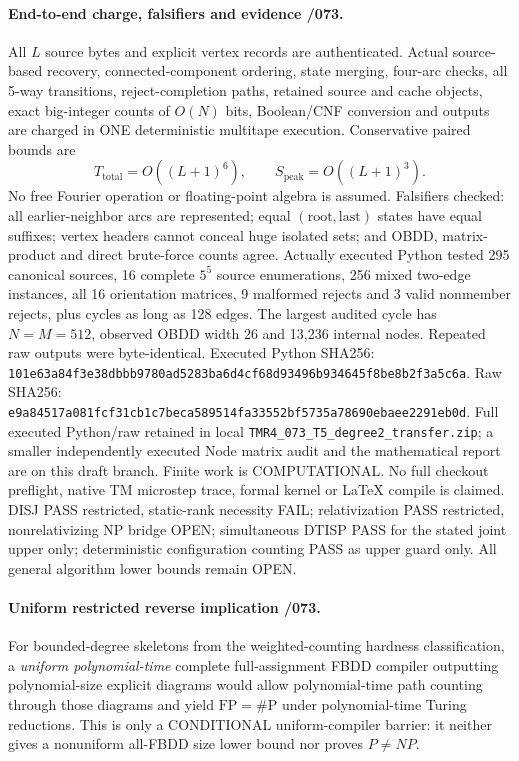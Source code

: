 \documentclass[11pt]{article}
\begin{document}
\paragraph{End-to-end charge, falsifiers and evidence /073.}
All $L$ source bytes and explicit vertex records are authenticated.
Actual source-based recovery, connected-component ordering, state
merging, four-arc checks, all 5-way transitions, reject-completion
paths, retained source and cache objects, exact big-integer
counts of $O(N)$ bits, Boolean/CNF conversion and outputs are
charged in ONE deterministic multitape execution. Conservative
paired bounds are
\[
 T_{\mathrm{total}}=O((L+1)^6),\qquad
 S_{\mathrm{peak}}=O((L+1)^3).
\]
No free Fourier operation or floating-point algebra is assumed.
Falsifiers checked: all earlier-neighbor arcs are represented;
equal $(\mathrm{root},\mathrm{last})$ states have equal suffixes;
vertex headers cannot conceal huge isolated sets; and OBDD,
matrix-product and direct brute-force counts agree.
Actually executed Python tested 295 canonical sources,
16 complete $5^5$ source enumerations, 256 mixed two-edge
instances, all 16 orientation matrices, 9 malformed rejects
and 3 valid nonmember rejects, plus cycles as long as 128 edges.
The largest audited cycle has $N=M=512$, observed OBDD width 26
and 13,236 internal nodes. Repeated raw outputs were byte-identical.
Executed Python SHA256:
\texttt{101e63a84f3e38dbbb9780ad5283ba6d4cf68d93496b934645f8be8b2f3a5c6a}.
Raw SHA256:
\texttt{e9a84517a081fcf31cb1c7beca589514fa33552bf5735a78690ebaee2291eb0d}.
Full executed Python/raw retained in local
\texttt{TMR4\_073\_T5\_degree2\_transfer.zip};
a smaller independently executed Node matrix audit and the
mathematical report are on this draft branch.
Finite work is COMPUTATIONAL. No full checkout preflight,
native TM microstep trace, formal kernel or LaTeX compile is claimed.
DISJ PASS restricted, static-rank necessity FAIL;
relativization PASS restricted, nonrelativizing NP bridge OPEN;
simultaneous DTISP PASS for the stated joint upper only;
deterministic configuration counting PASS as upper guard only.
All general algorithm lower bounds remain OPEN.

\paragraph{Uniform restricted reverse implication /073.}
For bounded-degree skeletons from the weighted-counting hardness
classification, a \emph{uniform polynomial-time} complete
full-assignment FBDD compiler outputting polynomial-size explicit
diagrams would allow polynomial-time path counting through
those diagrams and yield $\mathrm{FP}=\#\mathrm P$ under
polynomial-time Turing reductions. This is only a CONDITIONAL
uniform-compiler barrier: it neither gives a nonuniform all-FBDD
size lower bound nor proves $P\ne NP$.
\end{document}
